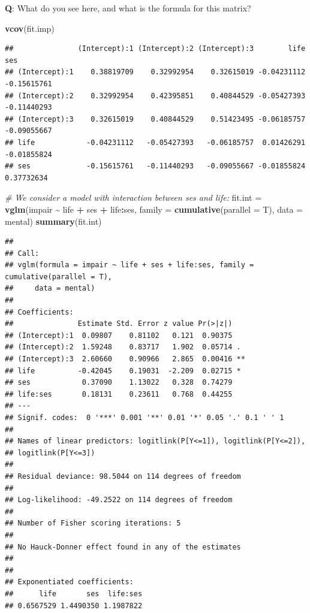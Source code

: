 \documentclass[
  ignorenonframetext,
]{beamer}
\newenvironment{Shaded}{\begin{snugshade}}{\end{snugshade}}
\newcommand{\AttributeTok}[1]{\textcolor[rgb]{0.13,0.29,0.53}{#1}}
\newcommand{\CommentTok}[1]{\textcolor[rgb]{0.56,0.35,0.01}{\textit{#1}}}
\newcommand{\FunctionTok}[1]{\textcolor[rgb]{0.13,0.29,0.53}{\textbf{#1}}}
\newcommand{\NormalTok}[1]{#1}
\newcommand{\OtherTok}[1]{\textcolor[rgb]{0.56,0.35,0.01}{#1}}
\newcommand{\SpecialCharTok}[1]{\textcolor[rgb]{0.81,0.36,0.00}{\textbf{#1}}}
\begin{document}
\begin{frame}[fragile]
\textbf{Q}: What do you see here, and what is the formula for this
matrix?

\begin{Shaded}
\begin{Highlighting}[]
\FunctionTok{vcov}\NormalTok{(fit.imp)}
\end{Highlighting}
\end{Shaded}

\begin{verbatim}
##               (Intercept):1 (Intercept):2 (Intercept):3        life         ses
## (Intercept):1    0.38819709    0.32992954    0.32615019 -0.04231112 -0.15615761
## (Intercept):2    0.32992954    0.42395851    0.40844529 -0.05427393 -0.11440293
## (Intercept):3    0.32615019    0.40844529    0.51423495 -0.06185757 -0.09055667
## life            -0.04231112   -0.05427393   -0.06185757  0.01426291 -0.01855824
## ses             -0.15615761   -0.11440293   -0.09055667 -0.01855824  0.37732634
\end{verbatim}
\end{frame}

\begin{frame}[fragile]
\begin{Shaded}
\begin{Highlighting}[]
\CommentTok{\# We consider a model with interaction between \textquotesingle{}ses\textquotesingle{} and \textquotesingle{}life\textquotesingle{}:}
\NormalTok{fit.int }\OtherTok{=} \FunctionTok{vglm}\NormalTok{(impair }\SpecialCharTok{\textasciitilde{}}\NormalTok{ life }\SpecialCharTok{+}\NormalTok{ ses }\SpecialCharTok{+}\NormalTok{ life}\SpecialCharTok{:}\NormalTok{ses, }\AttributeTok{family =} \FunctionTok{cumulative}\NormalTok{(}\AttributeTok{parallel =}\NormalTok{ T),}
    \AttributeTok{data =}\NormalTok{ mental)}
\FunctionTok{summary}\NormalTok{(fit.int)}
\end{Highlighting}
\end{Shaded}

\begin{verbatim}
## 
## Call:
## vglm(formula = impair ~ life + ses + life:ses, family = cumulative(parallel = T), 
##     data = mental)
## 
## Coefficients: 
##               Estimate Std. Error z value Pr(>|z|)   
## (Intercept):1  0.09807    0.81102   0.121  0.90375   
## (Intercept):2  1.59248    0.83717   1.902  0.05714 . 
## (Intercept):3  2.60660    0.90966   2.865  0.00416 **
## life          -0.42045    0.19031  -2.209  0.02715 * 
## ses            0.37090    1.13022   0.328  0.74279   
## life:ses       0.18131    0.23611   0.768  0.44255   
## ---
## Signif. codes:  0 '***' 0.001 '**' 0.01 '*' 0.05 '.' 0.1 ' ' 1
## 
## Names of linear predictors: logitlink(P[Y<=1]), logitlink(P[Y<=2]), 
## logitlink(P[Y<=3])
## 
## Residual deviance: 98.5044 on 114 degrees of freedom
## 
## Log-likelihood: -49.2522 on 114 degrees of freedom
## 
## Number of Fisher scoring iterations: 5 
## 
## No Hauck-Donner effect found in any of the estimates
## 
## 
## Exponentiated coefficients:
##      life       ses  life:ses 
## 0.6567529 1.4490350 1.1987822
\end{verbatim}
\end{frame}
\end{document}
